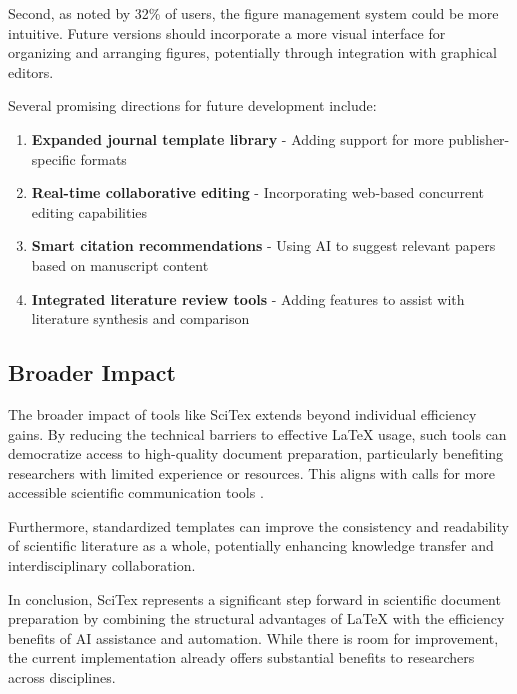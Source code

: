 Second, as noted by 32\% of users, the figure management system could be more intuitive. Future versions should incorporate a more visual interface for organizing and arranging figures, potentially through integration with graphical editors.


Several promising directions for future development include:

\begin{enumerate}
    \item \textbf{Expanded journal template library} - Adding support for more publisher-specific formats
    \item \textbf{Real-time collaborative editing} - Incorporating web-based concurrent editing capabilities
    \item \textbf{Smart citation recommendations} - Using AI to suggest relevant papers based on manuscript content
    \item \textbf{Integrated literature review tools} - Adding features to assist with literature synthesis and comparison
\end{enumerate}

\subsection{Broader Impact}
\label{subsec:impact}

The broader impact of tools like SciTex extends beyond individual efficiency gains. By reducing the technical barriers to effective LaTeX usage, such tools can democratize access to high-quality document preparation, particularly benefiting researchers with limited experience or resources. This aligns with calls for more accessible scientific communication tools \cite{Patel2022}.

Furthermore, standardized templates can improve the consistency and readability of scientific literature as a whole, potentially enhancing knowledge transfer and interdisciplinary collaboration.

In conclusion, SciTex represents a significant step forward in scientific document preparation by combining the structural advantages of LaTeX with the efficiency benefits of AI assistance and automation. While there is room for improvement, the current implementation already offers substantial benefits to researchers across disciplines.

